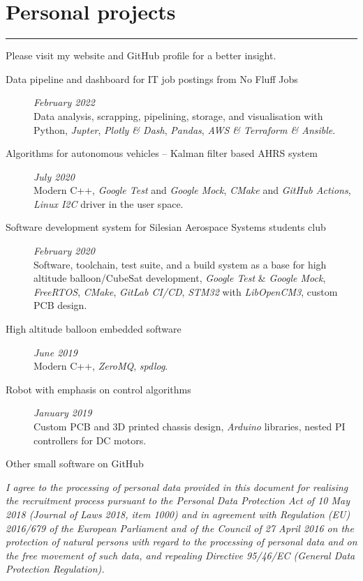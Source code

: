 \documentclass{article}
\begin{document}
\section*{Personal projects}
\hrule \medskip
Please visit my website and GitHub profile for a better insight.
\begin{description}
	\item [Data pipeline and dashboard for IT job postings from No Fluff Jobs] \textit{February 2022} \\
		Data analysis, scrapping, pipelining, storage, and visualisation with Python,
		\textit{Jupter},
		\textit{Plotly \& Dash},
		\textit{Pandas},
		\textit{AWS \& Terraform \& Ansible}.
	\item [Algorithms for autonomous vehicles -- Kalman filter based AHRS system] \textit{July 2020} \\
		Modern C++,
		\textit{Google Test} and \textit{Google Mock},
		\textit{CMake} and \textit{GitHub Actions},
		\textit{Linux I2C} driver in the user space.
	\item [Software development system for Silesian Aerospace Systems students club] \textit{February 2020} \\
		Software, toolchain, test suite, and a build system as a base for high altitude balloon/CubeSat development, 
		\textit{Google Test} \& \textit{Google Mock},
		\textit{FreeRTOS},
		\textit{CMake},
		\textit{GitLab CI/CD},
		\textit{STM32} with \textit{LibOpenCM3},
		custom PCB design.
	\item [High altitude balloon embedded software] \textit{June 2019} \\
		Modern C++,
		\textit{ZeroMQ},
		\textit{spdlog}.
	\item [Robot with emphasis on control algorithms] \textit{January 2019} \\
		Custom PCB and 3D printed chassis design,
		\textit{Arduino} libraries,
		nested PI controllers for DC motors.
	\item [Other small software on GitHub]
\end{description}
\vfill
\small{
\textit{I agree to the processing of personal data provided in this document for
realising the recruitment process pursuant to the Personal Data Protection Act
of 10 May 2018 (Journal of Laws 2018, item 1000) and in agreement with
Regulation (EU) 2016/679 of the European Parliament and of the Council of 27
April 2016 on the protection of natural persons with regard to the processing of
personal data and on the free movement of such data, and repealing Directive
95/46/EC (General Data Protection Regulation).}
}
\end{document}
